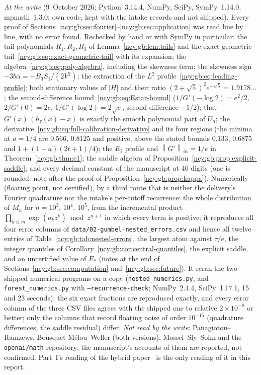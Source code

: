 \documentclass[11pt,letterpaper]{article}
\numberwithin{equation}{section}
\theoremstyle{remark}\newtheorem{remark}[theorem]{Remark}
\newcommand{\file}[1]{\nolinkurl{#1}}
\theoremstyle{definition}\newtheorem{definition}[theorem]{Definition}\theoremstyle{plain}
\newcommand{\norminf}[1]{\left\lVert #1\right\rVert_\infty}
\begin{document}
\emph{At the write} (9~October 2026; Python~3.14.4, NumPy, SciPy, SymPy~1.14.0,
mpmath~1.3.0; own code, kept with the intake records and not shipped). Every
proof of Sections~\ref{ncy:gb:sec:fourier}--\ref{ncy:gb:sec:application} was
read line by line, with no error found. Rechecked by hand or with SymPy in
particular: the tail polynomials $R_1,R_2,R_3$ of
Lemma~\ref{ncy:gb:lem:tails} and the exact geometric
tail~\eqref{ncy:gb:eq:exact-geometric-tail} with its expansion; the
algebra~\eqref{ncy:gb:eq:poly-algebra}, including the skewness term; the
skewness sign $-3b\alpha=-B_3S_1/(2V^2)$; the extraction of the $L^2$
profile~\eqref{ncy:gb:eq:leading-profile}; both stationary values of $|H|$
and their ratio $(2+\sqrt5)^2e^{-\sqrt5}=1.9178\ldots$; the second-difference
bound~\eqref{ncy:gb:eq:Estar-bound} ($1/G'(-\log2)=e^2/2$, $2/G'(0)=2e$,
$1/G'(\log2)=2\sqrt e$, second difference $-1/2$); that
$G'(x)\,(h_\tau(x)-x)$ is exactly the smooth polynomial part of $U_n$; the
derivative~\eqref{ncy:gb:eq:full-calibration-derivative} and its four
regions (the minima at $a=1/4$ are $0.566$, $0.8125$ and positive, above the
stated bounds $0.133$, $0.6875$ and $1+(1-a)(2t+1)/4$); the $E_1$ profile and
$\norminf{G'}=1/e$ in Theorem~\ref{ncy:gb:thm:e1}; the saddle
algebra of Proposition~\ref{ncy:gb:prop:explicit-saddle}; and every decimal
constant of the manuscript at 40 digits (one is rounded: note after the
proof of Proposition~\ref{ncy:gb:prop:kappa}). Numerically (floating point,
not certified), by a third route that is neither the delivery's Fourier
quadrature nor the intake's per-cutoff recurrence: the whole distribution of
$M_n$ for $n=10^3$, $10^4$, $10^5$, from the incremental product
$\prod_{k\le m}\exp(a_kz^k)\bmod z^{n+1}$ in which every term is positive; it
reproduces all four error columns of \file{data/02-gumbel-nested_errors.csv}
and hence all twelve entries of Table~\ref{ncy:gb:tab:nested-errors}, the
largest atom against $\tau/e$, the integer quantiles of
Corollary~\ref{ncy:gb:cor:central-quantiles}, the explicit saddle, and an
uncertified value of $E_*$ (notes at the end of
Sections~\ref{ncy:gb:sec:computation} and~\ref{ncy:gb:sec:future}).
It reran the two shipped numerical programs on a copy
(\file{nested_numerics.py}, and \file{forest_numerics.py} with
\texttt{--recurrence-check}; NumPy~2.4.4, SciPy~1.17.1, 15 and 23 seconds):
the six exact fractions are reproduced exactly, and every error column of the
three CSV files agrees with the shipped one to relative $2\times10^{-8}$ or
better; only the columns that record floating noise of order $10^{-15}$
(quadrature differences, the saddle residual) differ.
\emph{Not read by the write}: Panagiotou--Ramzews, Bousquet-M\'elou--Weller
(both versions), Mossel--Sly--Sohn and the \texttt{openai/math} repository;
the manuscript's accounts of them are reported, not confirmed. Part~I's
reading of the hybrid paper~\cite{hybrid} is the only reading of it in this
report.
\end{document}
